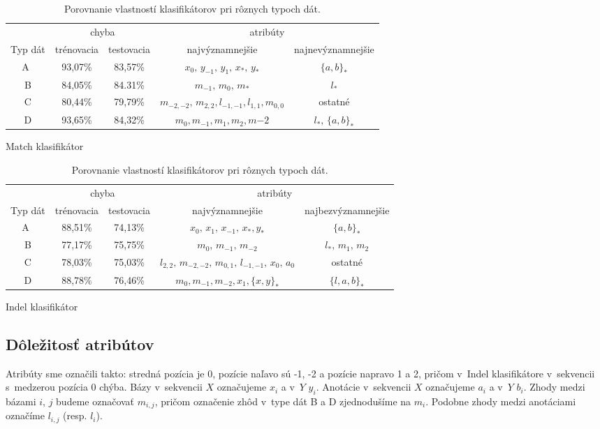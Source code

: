 \begin{table}[htp]
\centering
\begin{subtable}{\textwidth}
\centering
\begin{tabular}{c|cccc}
& \multicolumn{2}{c}{chyba} & \multicolumn{2}{c}{atribúty}\\
Typ dát & trénovacia & testovacia & najvýznamnejšie & najnevýznamnejšie\\
\hline
A~& 93,07\% & 83,57\% & $x_0,\, y_{-1},\, y_{1},\, x_*,\, y_*$ & $\{a,b\}_*$\\
B & 84,05\% & 84.31\% & $m_{-1},\, m_0,\, m_*$ & $l_*$ \\
C & 80,44\% & 79,79\% & $m_{-2,-2},\, m_{2,2}, l_{-1,-1}, l_{1,1}, m_{0,0}$ & ostatné\\
D & 93,65\% & 84,32\% & $m_0, m_{-1}, m_1, m_2, m{-2}$ & $l_*,\, \{a,b\}_*$
\end{tabular}
\caption{Match klasifikátor}
\end{subtable}

\begin{subtable}{\textwidth}
\centering
\begin{tabular}{c|cccc}
& \multicolumn{2}{c}{chyba} & \multicolumn{2}{c}{atribúty}\\
Typ dát & trénovacia & testovacia & najvýznamnejšie & najbezvýznamnejšie\\
\hline
A~& 88,51\% & 74,13\% & $x_0,\, x_{1},\, x_{-1},\, x_*, y_*$ & $\{a,b\}_*$\\
B & 77,17\% & 75,75\% & $m_0,\, m_{-1},\, m_{-2}$ & $l_*,\, m_1,\, m_2$ \\
C & 78,03\% & 75,03\% & $l_{2,2},\,m_{-2,-2},\,m_{0,1},\,l_{-1,-1},\, x_0,\,a_0$ & ostatné\\
D & 88,78\% & 76,46\% & $m_0, m_{-1}, m_{-2}, x_1, \{x, y\}_*$ & $\{l,a,b\}_*$\\
\end{tabular}
\caption{Indel klasifikátor}
\end{subtable}
\caption[Porovnanie vlastností klasifikátorov]{Porovnanie vlastností klasifikátorov pri rôznych typoch dát.}
\label{tab:clf-results}
\end{table}

\subsection{Dôležitosť atribútov}

Atribúty sme označili takto: stredná pozícia je 0, pozície naľavo sú -1, -2 a pozície napravo 1 a 2, pričom v~Indel klasifikátore v~sekvencii s~medzerou pozícia 0 chýba. Bázy v~sekvencii $X$ označujeme $x_i$ a v~$Y$ $y_i$. Anotácie v~sekvencii $X$ označujeme $a_i$ a v~$Y$ $b_i$. Zhody medzi bázami $i,\, j$ budeme označovať $m_{i, j}$, pričom označenie zhôd v~type dát B a D zjednodušíme na $m_i$. Podobne zhody medzi anotáciami označíme $l_{i, j}$ (resp. $l_i$).

